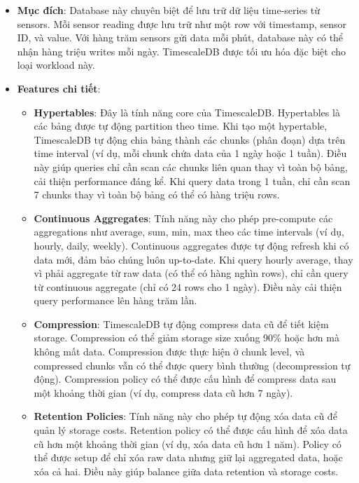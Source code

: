 \begin{itemize}
    \item \textbf{Mục đích}: Database này chuyên biệt để lưu trữ dữ liệu time-series từ sensors. Mỗi sensor reading được lưu trữ như một row với timestamp, sensor ID, và value. Với hàng trăm sensors gửi data mỗi phút, database này có thể nhận hàng triệu writes mỗi ngày. TimescaleDB được tối ưu hóa đặc biệt cho loại workload này.
    
    \item \textbf{Features chi tiết}:
        \begin{itemize}
            \item \textbf{Hypertables}: Đây là tính năng core của TimescaleDB. Hypertables là các bảng được tự động partition theo time. Khi tạo một hypertable, TimescaleDB tự động chia bảng thành các chunks (phân đoạn) dựa trên time interval (ví dụ, mỗi chunk chứa data của 1 ngày hoặc 1 tuần). Điều này giúp queries chỉ cần scan các chunks liên quan thay vì toàn bộ bảng, cải thiện performance đáng kể. Khi query data trong 1 tuần, chỉ cần scan 7 chunks thay vì toàn bộ bảng có thể có hàng triệu rows.
            
            \item \textbf{Continuous Aggregates}: Tính năng này cho phép pre-compute các aggregations như average, sum, min, max theo các time intervals (ví dụ, hourly, daily, weekly). Continuous aggregates được tự động refresh khi có data mới, đảm bảo chúng luôn up-to-date. Khi query hourly average, thay vì phải aggregate từ raw data (có thể có hàng nghìn rows), chỉ cần query từ continuous aggregate (chỉ có 24 rows cho 1 ngày). Điều này cải thiện query performance lên hàng trăm lần.
            
            \item \textbf{Compression}: TimescaleDB tự động compress data cũ để tiết kiệm storage. Compression có thể giảm storage size xuống 90\% hoặc hơn mà không mất data. Compression được thực hiện ở chunk level, và compressed chunks vẫn có thể được query bình thường (decompression tự động). Compression policy có thể được cấu hình để compress data sau một khoảng thời gian (ví dụ, compress data cũ hơn 7 ngày).
            
            \item \textbf{Retention Policies}: Tính năng này cho phép tự động xóa data cũ để quản lý storage costs. Retention policy có thể được cấu hình để xóa data cũ hơn một khoảng thời gian (ví dụ, xóa data cũ hơn 1 năm). Policy có thể được setup để chỉ xóa raw data nhưng giữ lại aggregated data, hoặc xóa cả hai. Điều này giúp balance giữa data retention và storage costs.
        \end{itemize}
    

\end{itemize}
